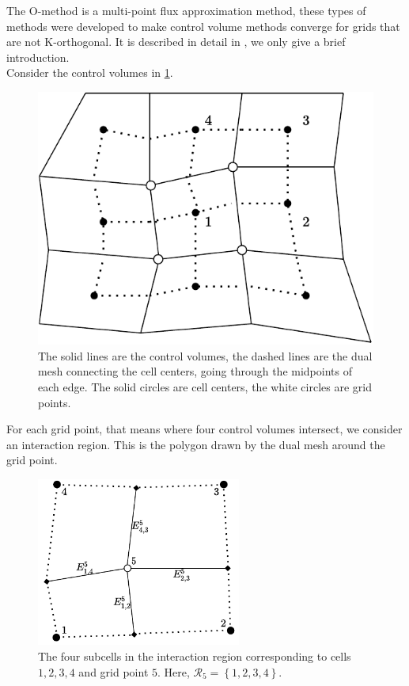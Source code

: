 \documentclass[../Main/main.tex]{subfiles}
\begin{document}
	The O-method is a multi-point flux approximation method, these types of methods were developed to make control volume methods converge for grids that are not K-orthogonal. It is described in detail in  \cite{Aavatsmark2002}, we only give a brief introduction.
	\\
	Consider the control volumes in \ref{fig:dualmesh}.
	\begin{figure}[H]
		\centering
		\includegraphics{dualmesh.pdf}
		
		\caption{The solid lines are the control volumes, the dashed lines are the dual mesh connecting the cell centers, going through the midpoints of each edge. The solid circles are cell centers, the white circles are grid points.}
		\label{fig:dualmesh}
	\end{figure}
	For each grid point, that means where four control volumes intersect, we consider an interaction region. This is the polygon drawn by the dual mesh around the grid point.
	\begin{figure}[H]
		\centering
		\includegraphics[width=0.6\textwidth]{Interaction region.pdf}
		\caption{The four subcells in the interaction region corresponding to cells $1,2,3,4$ and grid point $5$. Here, $\mathcal{R}_5 = \left \{1,2,3,4 \right\}$.}
		\label{fig:interactionregion}
	\end{figure}
\end{document}
